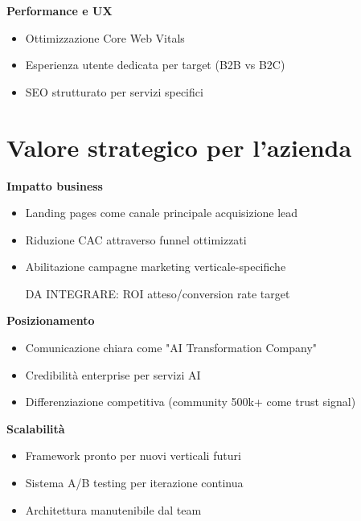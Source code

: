 \textbf{Performance e UX}
\begin{itemize}
  \item Ottimizzazione Core Web Vitals
  \item Esperienza utente dedicata per target (B2B vs B2C)
  \item SEO strutturato per servizi specifici
\end{itemize}

\section{Valore strategico per l'azienda}
\textbf{Impatto business}
\begin{itemize}
  \item Landing pages come canale principale acquisizione lead
  \item Riduzione CAC attraverso funnel ottimizzati
  \item Abilitazione campagne marketing verticale-specifiche
  \item [DA INTEGRARE: ROI atteso/conversion rate target]
\end{itemize}

\textbf{Posizionamento}
\begin{itemize}
  \item Comunicazione chiara come "AI Transformation Company"
  \item Credibilità enterprise per servizi AI
  \item Differenziazione competitiva (community 500k+ come trust signal)
\end{itemize}

\textbf{Scalabilità}
\begin{itemize}
  \item Framework pronto per nuovi verticali futuri
  \item Sistema A/B testing per iterazione continua
  \item Architettura manutenibile dal team
\end{itemize}